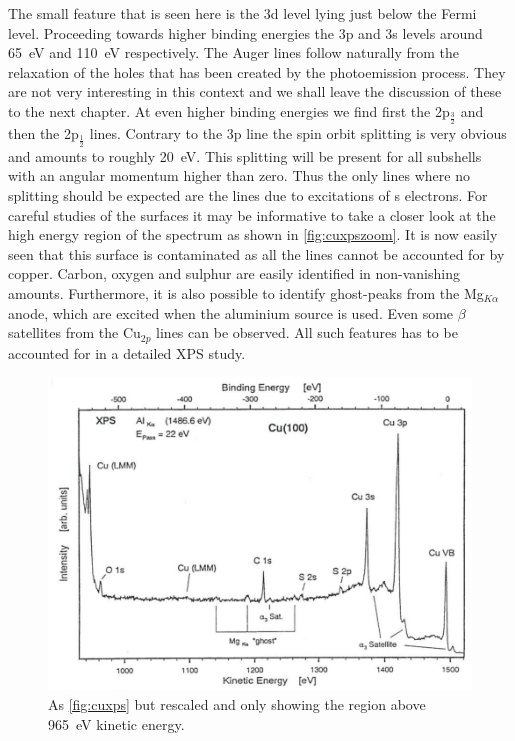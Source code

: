 The small feature that is seen here is the 3d level lying just below the Fermi level. Proceeding towards higher binding energies the 3p and 3s levels around \SI{65}{\electronvolt} and \SI{110}{\electronvolt} respectively. The Auger  lines follow naturally from the relaxation of the  holes  that  has  been created by the photoemission process. They are not very interesting in this context and we shall leave the discussion of these to the next chapter. At even higher binding energies we find first  the 2p$_{\frac{3}{2}}$ and then the 2p$_{\frac{1}{2}}$ lines. Contrary to the  3p line the spin orbit splitting is very obvious and amounts to roughly \SI{20}{\electronvolt}. This splitting will be present for all subshells with an angular momentum higher than zero. Thus the only lines where no splitting should be expected are the lines due to excitations of s electrons. For careful studies of the surfaces it may be informative to take a closer look at the high energy region of the spectrum as shown in \autoref{fig:cuxpszoom}. It is now easily seen that this surface is contaminated as all the lines cannot be accounted for by copper. Carbon, oxygen and sulphur are easily identified in non-vanishing amounts. Furthermore, it is also possible to identify ghost-peaks from the Mg$_{K\alpha}$ anode, which are excited when the aluminium source is used. Even some $\beta$ satellites from the Cu$_{2p}$ lines can be observed. All such features has to be accounted for in a detailed XPS study.

\begin{figure}[h!]
	\begin{center}
	\includegraphics[width=\textwidth]{figures/04_08.png}
	\caption{As \autoref{fig:cuxps} but rescaled and only showing the region above \SI{965}{\electronvolt} kinetic energy.}
	\label{fig:cuxpszoom}
	\end{center}
\end{figure}

